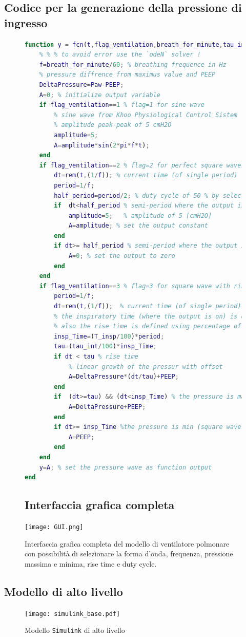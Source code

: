 \subsection*{Codice per la generazione della pressione di ingresso}
 \begin{figure}[h!]
\begin{lstlisting}[language=matlab,basicstyle=\tiny\ttfamily,]
function y = fcn(t,flag_ventilation,breath_for_minute,tau_int,Paw,PEEP,T_insp)
	% % % to avoid error use the `odeN` solver !
	f=breath_for_minute/60; % breathing frequence in Hz
	% pressure diffrence from maximus value and PEEP
	DeltaPressure=Paw-PEEP; 
	A=0; % initialize output variable
	if flag_ventilation==1 % flag=1 for sine wave
		% sine wave from Khoo Physiological Control Sistem
		% amplitude peak-peak of 5 cmH2O
		amplitude=5;
		A=amplitude*sin(2*pi*f*t);  
	end
	if flag_ventilation==2 % flag=2 for perfect square wave
		dt=rem(t,(1/f)); % current time (of single period)
		period=1/f; 
		half_period=period/2; % duty cycle of 50 % by selecting half period
		if  dt<half_period % semi-period where the output is on
			amplitude=5;   % amplitude of 5 [cmH2O] 
			A=amplitude; % set the output constant
		end
		if dt>= half_period % semi-period where the output is zero
			A=0; % set the output to zero 
		end 
	end
	if flag_ventilation==3 % flag=3 for square wave with rise time tau
		period=1/f; 
		dt=rem(t,(1/f));  % current time (of single period)
		% the inspiratory time (where the output is on) is defined  usign percentage of total period with T_insp from ventilator GUI
		% also the rise time is defined using percentage of inspiratory time with tau_int from ventilator GUI
		insp_Time=(T_insp/100)*period; 
		tau=(tau_int/100)*insp_Time;
		if dt < tau % rise time
			% linear growth of the pressur with offset 
			A=DeltaPressure*(dt/tau)+PEEP; 
		end
		if  (dt>=tau) && (dt<insp_Time) % the pressure is max (square wave on)
			A=DeltaPressure+PEEP;
		end
		if dt>= insp_Time %the pressure is min (square wave off)
			A=PEEP;
		end 
	end
	y=A; % set the pressure wave as function output
end
\end{lstlisting}

\subsection*{Interfaccia grafica completa}

\centering\texttt{[image: GUI.png]}
	\caption{Interfaccia grafica completa del modello di ventilatore polmonare con possibilità di selezionare la forma d'onda, frequenza, pressione massima e minima, rise time e duty cycle.}
	\label{fig:interfaccia}
\end{figure}

\subsection*{Modello di alto livello}

\begin{figure}[h!]
	\texttt{[image: simulink\_base.pdf]}
\caption{Modello \texttt{Simulink} di alto livello}
\label{fig:generale}
\end{figure}